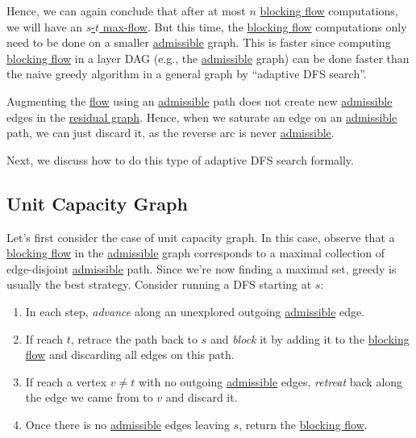 Hence, we can again conclude that after at most \(n\) \hyperref[def:blocking-flow]{blocking flow} computations, we will have an \hyperref[prb:s-t-max-flow]{\(s\)-\(t\) max-flow}. But this time, the \hyperref[def:blocking-flow]{blocking flow} computations only need to be done on a smaller \hyperref[def:admissible]{admissible} graph. This is faster since computing \hyperref[def:blocking-flow]{blocking flow} in a layer DAG (e.g., the \hyperref[def:admissible]{admissible} graph) can be done faster than the naive greedy algorithm in a general graph by ``adaptive DFS search''.

\begin{intuition}
	Augmenting the \hyperref[def:flow]{flow} using an \hyperref[def:admissible]{admissible} path does not create new \hyperref[def:admissible]{admissible} edges in the \hyperref[def:residual-graph]{residual graph}. Hence, when we saturate an edge on an \hyperref[def:admissible]{admissible} path, we can just discard it, as the reverse arc is never \hyperref[def:admissible]{admissible}.
\end{intuition}

Next, we discuss how to do this type of adaptive DFS search formally.

\subsection{Unit Capacity Graph}
Let's first consider the case of unit capacity graph. In this case, observe that a \hyperref[def:blocking-flow]{blocking flow} in the \hyperref[def:admissible]{admissible} graph corresponds to a maximal collection of edge-disjoint \hyperref[def:admissible]{admissible} path. Since we're now finding a maximal set, greedy is usually the best strategy. Consider running a DFS starting at \(s\):
\begin{enumerate}
	\item\label{algo:unit-adaptive-DFS-advance} In each step, \emph{advance} along an unexplored outgoing \hyperref[def:admissible]{admissible} edge.
	\item\label{algo:unit-adaptive-DFS-block} If reach \(t\), retrace the path back to \(s\) and \emph{block} it by adding it to the \hyperref[def:blocking-flow]{blocking flow} and discarding all edges on this path.
	\item\label{algo:unit-adaptive-DFS-retreat} If reach a vertex \(v \neq t\) with no outgoing \hyperref[def:admissible]{admissible} edges, \emph{retreat} back along the edge we came from to \(v\) and discard it.
	\item Once there is no \hyperref[def:admissible]{admissible} edges leaving \(s\), return the \hyperref[def:blocking-flow]{blocking flow}.
\end{enumerate}

